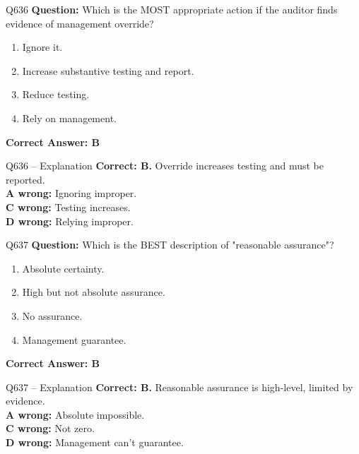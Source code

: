 \documentclass[aspectratio=169,10pt]{beamer}
\begin{document}
	\begin{frame}[t]{Q636}
		\small
		\textbf{Question:} Which is the MOST appropriate action if the auditor finds evidence of management override?
		\begin{enumerate}[label=\Alph*.,itemsep=1pt,topsep=2pt]
			\item Ignore it.
			\item Increase substantive testing and report.
			\item Reduce testing.
			\item Rely on management.
		\end{enumerate}
		\vspace{4pt}
		\textbf{Correct Answer: B}
	\end{frame}
	
	\begin{frame}[t]{Q636 -- Explanation}
		\small
		\textbf{Correct: B.} Override increases testing and must be reported. \\[4pt]
		\textbf{A wrong:} Ignoring improper. \\[2pt]
		\textbf{C wrong:} Testing increases. \\[2pt]
		\textbf{D wrong:} Relying improper.
	\end{frame}
	
	\begin{frame}[t]{Q637}
		\small
		\textbf{Question:} Which is the BEST description of "reasonable assurance"?
		\begin{enumerate}[label=\Alph*.,itemsep=1pt,topsep=2pt]
			\item Absolute certainty.
			\item High but not absolute assurance.
			\item No assurance.
			\item Management guarantee.
		\end{enumerate}
		\vspace{4pt}
		\textbf{Correct Answer: B}
	\end{frame}
	
	\begin{frame}[t]{Q637 -- Explanation}
		\small
		\textbf{Correct: B.} Reasonable assurance is high-level, limited by evidence. \\[4pt]
		\textbf{A wrong:} Absolute impossible. \\[2pt]
		\textbf{C wrong:} Not zero. \\[2pt]
		\textbf{D wrong:} Management can't guarantee.
	\end{frame}
	
\end{document}
